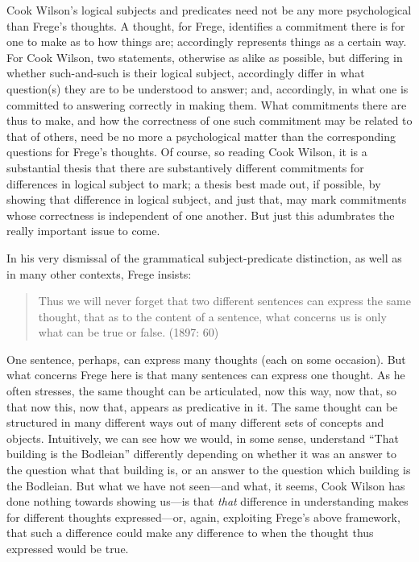 Cook Wilson's logical subjects and predicates need not be any more psychological than Frege’s thoughts. A thought, for Frege, identifies a commitment there is for one to make as to how things are; accordingly represents things as a certain way. For Cook Wilson, two statements, otherwise as alike as possible, but differing in whether such-and-such is their logical subject, accordingly differ in what question(s) they are to be understood to answer; and, accordingly, in what one is committed to answering correctly in making them. What commitments there are thus to make, and how the correctness of one such commitment may be related to that of others, need be no more a psychological matter than the corresponding questions for Frege’s thoughts. Of course, so reading Cook Wilson, it is a substantial thesis that there are substantively different commitments for differences in logical subject to mark; a thesis best made out, if possible, by showing that difference in logical subject, and just that, may mark commitments whose correctness is independent of one another. But just this adumbrates the really important issue to come.

In his very dismissal of the grammatical subject-predicate distinction, as well as in many other contexts, Frege insists:
\begin{quote}
	Thus we will never forget that two different sentences can express the same thought, that as to the content of a sentence, what concerns us is only what can be true or false. (1897: 60)
\end{quote}
One sentence, perhaps, can express many thoughts (each on some occasion). But what concerns Frege here is that many sentences can express one thought. As he often stresses, the same thought can be articulated, now this way, now that, so that now this, now that, appears as predicative in it. The same thought can be structured in many different ways out of many different sets of concepts and objects. Intuitively, we can see how we would, in some sense, understand ``That building is the Bodleian'' differently depending on whether it was an answer to the question what that building is, or an answer to the question which building is the Bodleian. But what we have not seen---and what, it seems, Cook Wilson has done nothing towards showing us---is that \emph{that} difference in understanding makes for different thoughts expressed---or, again, exploiting Frege’s above framework, that such a difference could make any difference to when the thought thus expressed would be true.

